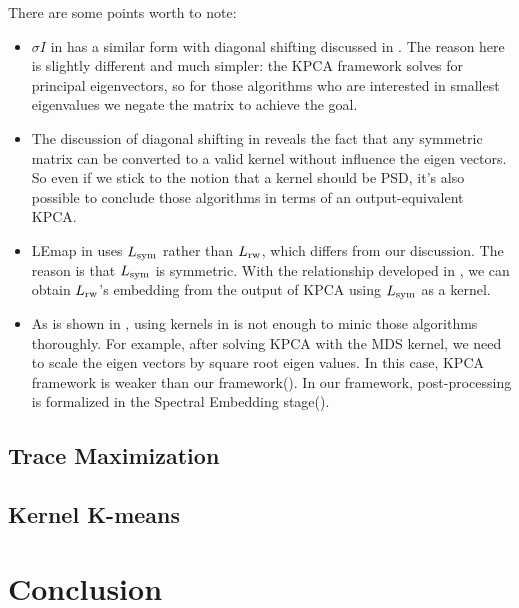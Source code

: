 There are some points worth to note:
\begin{itemize}
	\item $ \sigma I $ in \rtbl{\ref{tbl:kernel}} has a similar 
	form with diagonal shifting discussed in \rsec{\ref{sec:diags}}. 
	The reason here is slightly different and much simpler: the KPCA framework
	solves for principal eigenvectors, so for those algorithms 
	who are interested in smallest eigenvalues we negate the matrix 
	to achieve the goal. 
	\item The discussion of diagonal shifting in \rsec{\ref{sec:diags}}
	reveals the fact that any symmetric matrix can be converted to a valid
	kernel without influence the eigen vectors. So even if we stick 
	to the notion that a kernel should be PSD, it's also possible to 
	conclude those algorithms in terms of an output-equivalent KPCA. 
	\item LEmap in \rtbl{\ref{tbl:kernel}} uses $ L_{\text{sym}} $ rather than 
	$ L_{\text{rw}} $, which differs from our discussion. The reason is 
	that $ L_{\text{sym}} $ is symmetric. With the relationship developed in 
	\rsec{\ref{sec:adj_lap}}, we can obtain $ L_{\text{rw}} $'s embedding 
	from the output of KPCA using $ L_{\text{sym}} $ as a kernel. 
	\item As is shown in \cite{bengio2006spectral}, 
	using kernels in \rtbl{\ref{tbl:kernel}} is not enough to 
	minic those algorithms thoroughly. For example, after 
	solving KPCA with the MDS kernel, we need to scale the eigen 
	vectors by square root eigen values. In this case, KPCA framework 
	is weaker than our framework(\rsec{\ref{sec:framework}}). 
	In our framework, post-processing is formalized in the 
	Spectral Embedding stage(\rsec{\ref{sec:se}}). 
\end{itemize}


\subsection{Trace Maximization}
\label{sec:trmax}

\subsection{Kernel K-means}
\label{sec:kkmean}

\section{Conclusion}
\label{sec:conclusion}


